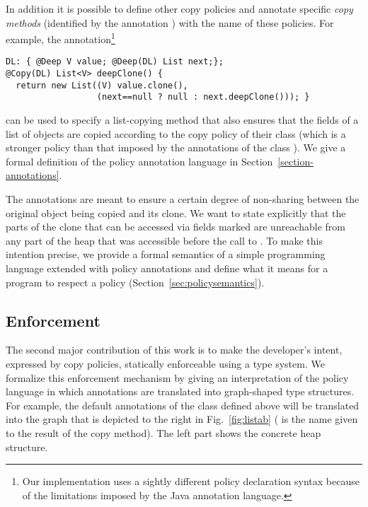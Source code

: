 \documentclass{LMCS}
\newcommand{\ttt}[1]{}
\begin{document}
In addition it is possible to define other copy policies and annotate specific
\emph{copy methods} (identified by the annotation \ttt{@Copy(...)}) with the name
of these policies.
For example, the annotation\footnote{Our implementation uses a sightly
different policy declaration syntax because of the limitations imposed by the
Java annotation language.}
\begin{lstlisting}
DL: { @Deep V value; @Deep(DL) List next;};
@Copy(DL) List<V> deepClone() {
  return new List((V) value.clone(),
                  (next==null ? null : next.deepClone())); }  
\end{lstlisting}
can be used to specify a list-copying method that also ensures that
the \ttt{value} fields of a list of objects are copied according to
the copy policy of their class (which  is a stronger policy than
that imposed by the annotations of the class \ttt{List}). We give a
formal definition of the policy annotation language in
Section~\ref{section-annotations}. 

The annotations are meant to ensure a certain degree of non-sharing between
the original object being copied and its clone. We want to state
explicitly that the parts of the clone that can be accessed via fields marked \ttt{@Deep}
are unreachable from any part of the heap that was accessible before the call
to \ttt{clone()}. To make this intention precise, we provide a formal
semantics of a simple programming language extended with policy annotations
and define what it means for a program to respect a policy
(Section~\ref{sec:policysemantics}). 

\subsection{Enforcement} 
\label{sec:intro:typ}

The second major contribution of this work is to make the developer's intent,
expressed by copy policies, statically enforceable using a type system.  We
formalize this enforcement mechanism by giving an interpretation of the policy
language in which annotations are translated into graph-shaped type
structures. For example, the default annotations of the \ttt{List} class defined above
will be translated into the graph that is depicted to the right in 
Fig.~\ref{fig:listab}  (\ttt{res} is the name given to
the result of the copy method). The left part shows the concrete heap structure.
\end{document}
